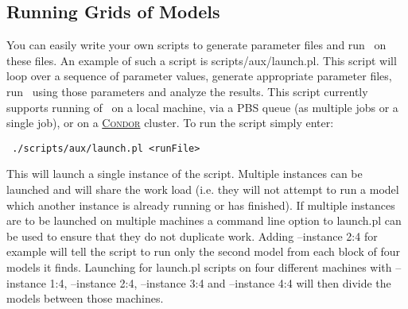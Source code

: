 \subsection{Running Grids of Models}\label{sec:RunningGrids}

You can easily write your own scripts to generate parameter files and run \glc\ on these files. An example of such a script is {\normalfont \ttfamily scripts/aux/launch.pl}. This script will loop over a sequence of parameter values, generate appropriate parameter files, run \glc\ using those parameters and analyze the results. This script currently supports running of \glc\ on a local machine, via a PBS queue (as multiple jobs or a single job), or on a \href{http://www.cs.wisc.edu/condor/}{{\normalfont \scshape Condor}} cluster. To run the script simply enter:
\begin{verbatim}
 ./scripts/aux/launch.pl <runFile>
\end{verbatim}
This will launch a single instance of the script. Multiple instances can be launched and will share the work load (i.e. they will not attempt to run a model which another instance is already running or has finished). If multiple instances are to be launched on multiple machines a command line option to {\normalfont \ttfamily launch.pl} can be used to ensure that they do not duplicate work. Adding {\normalfont \ttfamily --instance 2:4} for example will tell the script to run only the second model from each block of four models it finds. Launching for {\normalfont \ttfamily launch.pl} scripts on four different machines with {\normalfont \ttfamily --instance 1:4}, {\normalfont \ttfamily --instance 2:4}, {\normalfont \ttfamily --instance 3:4} and {\normalfont \ttfamily --instance 4:4} will then divide the models between those machines.

